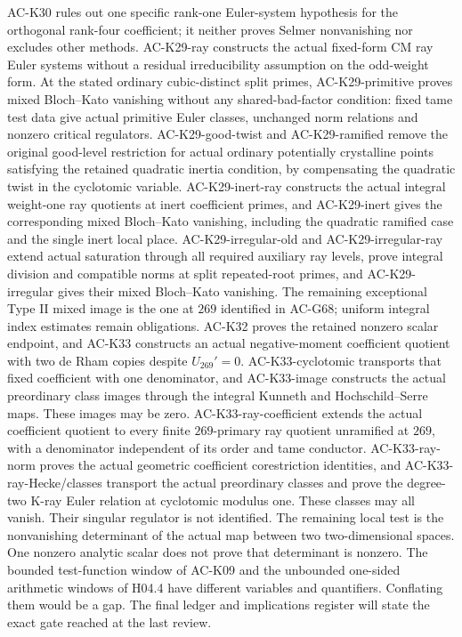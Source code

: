 \documentclass[11pt,a4paper]{article}
\theoremstyle{definition}
\theoremstyle{remark}
\begin{document}
AC-K30 rules out one specific rank-one
Euler-system hypothesis for the orthogonal rank-four coefficient;
it neither proves Selmer nonvanishing nor excludes other methods.
AC-K29-ray constructs the actual fixed-form CM ray Euler systems
without a residual irreducibility assumption on the odd-weight form.
At the stated ordinary cubic-distinct split primes,
AC-K29-primitive proves mixed Bloch--Kato vanishing without any
shared-bad-factor condition: fixed tame test data give actual primitive
Euler classes, unchanged norm relations and nonzero critical regulators.
AC-K29-good-twist and AC-K29-ramified remove the original good-level
restriction for actual ordinary potentially crystalline points satisfying
the retained quadratic inertia condition, by compensating the quadratic
twist in the cyclotomic variable. AC-K29-inert-ray constructs the actual
integral weight-one ray quotients at inert coefficient primes, and
AC-K29-inert gives the corresponding mixed Bloch--Kato vanishing,
including the quadratic ramified case and the single inert local place.
AC-K29-irregular-old and AC-K29-irregular-ray extend actual saturation
through all required auxiliary ray levels, prove integral division and
compatible norms at split repeated-root primes, and AC-K29-irregular
gives their mixed Bloch--Kato vanishing. The remaining exceptional
Type II mixed image is the one at $269$ identified in AC-G68;
uniform integral index estimates remain obligations.
AC-K32 proves the retained nonzero scalar endpoint, and AC-K33
constructs an actual negative-moment coefficient quotient with
two de Rham copies despite $U_{269}'=0$.  AC-K33-cyclotomic
transports that fixed coefficient with one denominator, and
AC-K33-image constructs the actual preordinary class images
through the integral Kunneth and Hochschild--Serre maps.  These
images may be zero.  AC-K33-ray-coefficient extends the actual
coefficient quotient to every finite $269$-primary ray quotient
unramified at $269$, with a denominator independent of its order
and tame conductor. AC-K33-ray-norm proves the actual geometric
coefficient corestriction identities, and AC-K33-ray-Hecke/classes
transport the actual preordinary classes and prove the degree-two
K-ray Euler relation at cyclotomic modulus one. These classes may
all vanish. Their singular regulator is not identified. The remaining local test
is the nonvanishing determinant of the actual map between two
two-dimensional spaces.  One nonzero analytic scalar does not
prove that determinant is nonzero.
The bounded test-function window of AC-K09 and the
unbounded one-sided arithmetic windows of H04.4 have
different variables and quantifiers. Conflating them
would be a gap. The final ledger and implications register
will state the exact gate reached at the last review.
\end{document}
